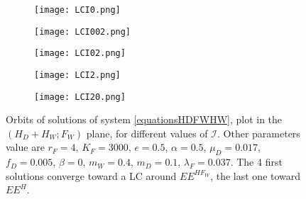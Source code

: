 \documentclass{article}
\newcommand{\lfw}{\lambda_{F}}
\newcommand{\lfw}{\lambda_{F}}
\newcommand{\cI}{\mathcal{I}}
\begin{document}
\begin{figure}[!ht]
\centering
\begin{subfigure}{0.48\textwidth}
\centering
\texttt{[image: LCI0.png]}
\caption{}
\end{subfigure}
\begin{subfigure}{0.48\textwidth}
\centering
\texttt{[image: LCI002.png]}
\caption{}
\end{subfigure}
\hfill
\begin{subfigure}{0.49\textwidth}
\texttt{[image: LCI02.png]}
\caption{}
\end{subfigure}
\hfill
\begin{subfigure}{0.49\textwidth}
\texttt{[image: LCI2.png]}
\caption{}
\end{subfigure}
\begin{subfigure}{0.49\textwidth}
\texttt{[image: LCI20.png]}
\caption{}
\end{subfigure}
\caption{\centering Orbits of solutions of system \eqref{equationsHDFWHW}, plot in the $(H_D+H_W ; F_W)$ plane, for different values of $\cI$. Other parameters value are $r_F = 4$, $K_F=3000$, $e=0.5$, $\alpha = 0.5$, $\mu_D = 0.017$, $f_D = 0.005$, $\beta =0$, $m_W = 0.4$, $m_D = 0.1$, $\lfw = 0.037$. The 4 first solutions converge toward a LC around $EE^{HF_W}$, the last one toward $EE^{H}$.}
\end{figure}

\newpage



\end{document}
